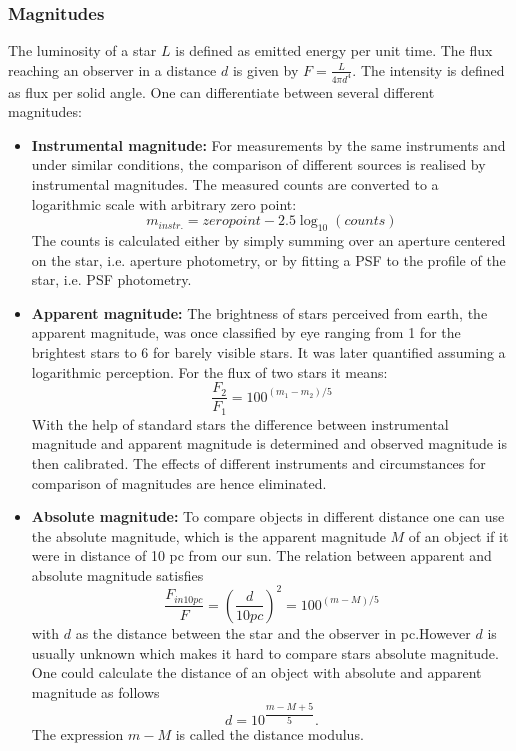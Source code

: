 \subsubsection{Magnitudes}
The luminosity of a star $L$ is defined as emitted energy per unit time. The flux reaching an observer in a distance $d$ is given by $F=\frac{L}{4\pi d^4}$. The intensity is defined as flux per solid angle. One can differentiate between several different magnitudes:
\hspace{3mm}
\begin{itemize}
\item\textbf{Instrumental magnitude:}
For measurements by the same instruments and under similar conditions, the comparison of different sources is realised by instrumental magnitudes. The measured counts are converted to a logarithmic scale with arbitrary zero point: 
\begin{equation}
\label{instrumental}
	m_{instr.} = zero point -2.5 \log_{10} {(counts)}
\end{equation}
The counts is calculated either by simply summing over an aperture centered on the star, i.e. aperture photometry, or by fitting a PSF to the profile of the star, i.e. PSF photometry.

\item\textbf{Apparent magnitude:}
The brightness of stars perceived from earth, the apparent magnitude, was once classified by eye ranging from 1 for the brightest stars to 6 for barely visible stars. It was later quantified assuming a logarithmic perception. For the flux of two stars it means:
\begin{equation}
\label{Flux}
	\frac{F_2}{F_1}=100^{(m_1-m_2)/5}
\end{equation}
With the help of standard stars the difference between instrumental magnitude and apparent magnitude is determined and observed magnitude is then calibrated. The effects of different instruments and circumstances for comparison of magnitudes are hence eliminated.

\item\textbf{Absolute magnitude:}
To compare objects in different distance one can use the absolute magnitude, which is the apparent magnitude $M$ of an object if it were in distance of 10 pc from our sun. The relation between apparent and absolute magnitude satisfies 
\begin{equation}
\label{AppAbs}
	\frac{F_{in 10 pc}}{F}=(\frac{d}{10 pc})^2=100^{(m-M)/5}
\end{equation}
with $d$ as the distance between the star and the observer in pc.However $d$ is usually unknown which makes it hard to compare stars absolute magnitude. One could calculate the distance of an object with absolute and apparent magnitude as follows
\begin{equation}
	d = 10^{\dfrac{m-M+5}{5}}.
\end{equation} 
The expression $m-M$ is called the distance modulus. 


\end{itemize}
